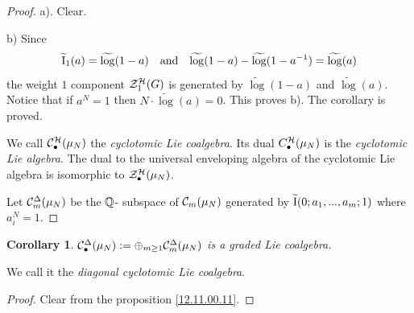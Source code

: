 \documentclass[10pt]{article}
\newtheorem{corollary}[theorem]{Corollary}
\begin{document}
\begin{proof} a). Clear. 

b) 
Since $$
\widetilde {\rm I}_1(a) = \widetilde \log (1-a)\quad \mbox{and} \quad  
\widetilde \log (1-a) - \widetilde \log (1-a^{-1}) = \widetilde \log (a)
$$
 the  weight $1$ component ${\cal Z}^{{\cal H}}_{1}(G)$
is generated by $\widetilde \log (1-a)$ and $\widetilde \log (a)$. Notice that if $a^N=1$ then 
$N \cdot \widetilde \log (a) = 0$. This proves b). The corollary is proved. 


We call 
${\cal C}^{{\cal H}}_{\bullet}(\mu_N)$ the {\it cyclotomic Lie coalgebra}.   Its dual 
${C}^{{\cal H}}_{\bullet}(\mu_N)$ is the {\it cyclotomic Lie algebra}. 
The dual to the 
universal enveloping algebra  of the cyclotomic Lie algebra is 
isomorphic to ${\cal Z}^{{\cal H}}_{\bullet}(\mu_N)$. 


Let ${\cal C}_{m}^{\Delta}(\mu_N)$ be the ${\mathbb Q}$- subspace of  
${\cal C}_{m}(\mu_N)$ generated by 
$
\widetilde {\rm I}(0; a_1, ..., a_m; 1)$ where $ a_i^N =1$. 


\end{proof}

\begin{corollary} \label{ur8-11/1} ${\cal C}_{\bullet}^{\Delta}(\mu_N):= \oplus_{m\geq 1}{\cal C}_{m}^{\Delta}(\mu_N)$ 
is a graded Lie coalgebra. 
\end{corollary} 


We call it the  
 {\it diagonal cyclotomic Lie coalgebra}. 

\begin{proof} Clear from the  proposition \ref{12.11.00.11}. 


\end{proof}
\end{document}
